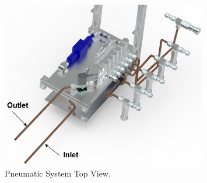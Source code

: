 \documentclass[a4paper,12pt,oneside]{article}
\providecommand{\DIFdelbegin}{} %
\providecommand{\DIFdelend}{} %
\newcommand{\DIFscaledelfig}{0.5}
\newlength{\DIFdelgraphicswidth} %
\newlength{\DIFdelgraphicsheight} %
\newcommand{\DIFdelincludegraphics}[2][]{%
\sbox{\DIFdelgraphicsbox}{\DIFOincludegraphics[#1]{#2}}%
\settoboxwidth{\DIFdelgraphicswidth}{\DIFdelgraphicsbox} %
\settoboxtotalheight{\DIFdelgraphicsheight}{\DIFdelgraphicsbox} %
\scalebox{\DIFscaledelfig}{%
\parbox[b]{\DIFdelgraphicswidth}{\usebox{\DIFdelgraphicsbox}\\[-\baselineskip] \rule{\DIFdelgraphicswidth}{0em}}\llap{\resizebox{\DIFdelgraphicswidth}{\DIFdelgraphicsheight}{%
\setlength{\unitlength}{\DIFdelgraphicswidth}%
\begin{picture}(1,1)%
\thicklines\linethickness{2pt} %
{\color[rgb]{1,0,0}\put(0,0){\framebox(1,1){}}}%
{\color[rgb]{1,0,0}\put(0,0){\line( 1,1){1}}}%
{\color[rgb]{1,0,0}\put(0,1){\line(1,-1){1}}}%
\end{picture}%
}\hspace*{3pt}}} %
} %
\DeclareRobustCommand{\DIFdelbegin}{\DIFOdelbegin \let\includegraphics\DIFdelincludegraphics} %
\DeclareRobustCommand{\DIFdelend}{\DIFOaddend \let\includegraphics\DIFOincludegraphics} %
\begin{document}
\DIFdelbegin %

\DIFdelend \begin{figure}[H]
    \centering
   \includegraphics[width=0.8\textwidth]{4-experiment-design/img/Mechanical/Figure_26.png}
   \caption{Pneumatic System Top View.}
    \label{pneumatic_system_cad}
\end{figure}


\DIFdelbegin %
\end{document}
